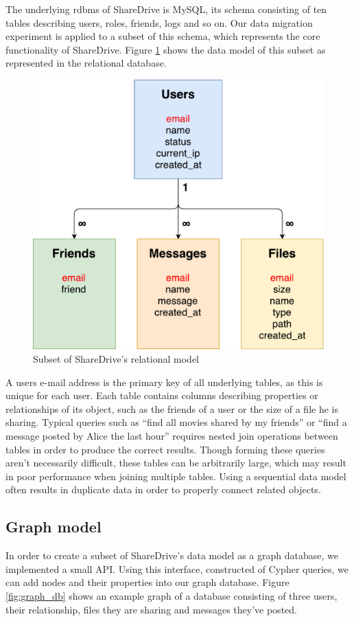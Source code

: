 \documentclass[a4paper, 12pt, conference]{IEEEtran}
\begin{document}
The underlying \gls{rdbms} of ShareDrive is MySQL, its schema consisting of ten tables describing users, roles, friends, logs and so on.
Our data migration experiment is applied to a subset of this schema, which represents the core functionality of ShareDrive. Figure \ref{fig:sql_db} shows the data model of this subset as represented in the relational database.

\begin{figure}[h]
	\centering
	\includegraphics[scale=0.45]{sql.pdf}
	\caption{Subset of ShareDrive's relational model}
	\label{fig:sql_db}
\end{figure}

A users e-mail address is the primary key of all underlying tables, as this is unique for each user. 
Each table contains columns describing properties or relationships of its object, such as the friends of a user or the size of a file he is sharing.
Typical queries such as “find all movies shared by my friends” or “find a message posted by Alice the last hour” requires nested join operations between tables in order to produce the correct results. 
Though forming these queries aren't necessarily difficult, these tables can be arbitrarily large, which may result in poor performance when joining multiple tables. 
Using a sequential data model often results in duplicate data in order to properly connect related objects.
\subsection{Graph model}
In order to create a subset of ShareDrive's data model as a graph database, we implemented a small API. 
Using this interface, constructed of Cypher queries, we can add nodes and their properties into our graph database. 
Figure \ref{fig:graph_db} shows an example graph of a database consisting of three users, their relationship, files they are sharing and messages they've posted.
\end{document}
